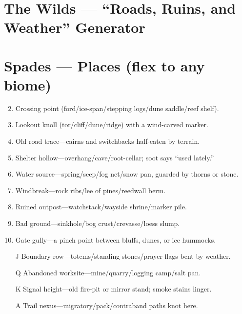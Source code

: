 \section{The Wilds --- ``Roads, Ruins, and Weather'' Generator}
\label{chap:wilderness}

\section*{Spades --- Places (flex to any biome)}
\label{sec:wilderness-places}
\begin{enumerate}
\setcounter{enumi}{1}
\item Crossing point (ford/ice-span/stepping logs/dune saddle/reef shelf).
\item Lookout knoll (tor/cliff/dune/ridge) with a wind-carved marker.
\item Old road trace---cairns and switchbacks half-eaten by terrain.
\item Shelter hollow---overhang/cave/root-cellar; soot says ``used lately.''
\item Water source---spring/seep/fog net/snow pan, guarded by thorns or stone.
\item Windbreak---rock ribs/lee of pines/reedwall berm.
\item Ruined outpost---watchstack/wayside shrine/marker pile.
\item Bad ground---sinkhole/bog crust/crevasse/loess slump.
\item Gate gully---a pinch point between bluffs, dunes, or ice hummocks.
\item[J] Boundary row---totems/standing stones/prayer flags bent by weather.
\item[Q] Abandoned worksite---mine/quarry/logging camp/salt pan.
\item[K] Signal height---old fire-pit or mirror stand; smoke stains linger.
\item[A] Trail nexus---migratory/pack/contraband paths knot here.
\end{enumerate}

